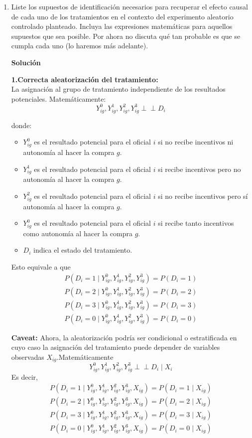 \documentclass[a4paper, answers, addpoints, 11pt]{exam}
\newenvironment{solucion}{%
  \begin{mdframed}[
    backgroundcolor=blue!5,    %
    linecolor=blue!50,          %
    linewidth=2pt,              %
    leftmargin=10pt,            %
    rightmargin=10pt,           %
    topline=true,              %
    bottomline=true,            %
    roundcorner=10pt,           %
    innerleftmargin=10pt,       %
    innerrightmargin=10pt,      %
    innerbottommargin=10pt,     %
    innertopmargin=10pt         %
  ]%
  \begin{tcolorbox}[colframe=blue!50!black, colback=blue!50, coltitle=white, sharp corners=all, boxrule=1mm, width=\textwidth, halign=left, valign=center, top=0mm, bottom=0mm, left=0mm, right=0mm] \textbf{Solución} \end{tcolorbox} }{\end{mdframed}}
\begin{document}
\begin{enumerate}
    \item Liste los supuestos de identificación necesarios para recuperar el efecto causal de cada uno de los tratamientos en el contexto del experimento aleatorio controlado planteado. Incluya las expresiones matemáticas para aquellos supuestos que sea posible. Por ahora no discuta qué tan probable es que se cumpla cada uno (lo haremos más adelante). 
    \begin{solucion}
    \textbf{1.Correcta aleatorización del tratamiento:}\\
    La asignación al grupo de tratamiento independiente de los resultados potenciales. Matemáticamente:
   \[
Y_{ig}^0, Y_{ig}^1, Y_{ig}^2, Y_{ig}^3 \perp\!\!\!\perp D_i
\]

donde:
\begin{itemize}
    \item \( Y_{ig}^0 \) es el resultado potencial para el oficial \( i \) si no recibe incentivos ni autonomía al hacer la compra \( g \).
  \item \( Y_{ig}^1 \) es el resultado potencial para el oficial \( i \) si recibe incentivos pero no autonomía al hacer la compra \( g \).
  \item \( Y_{ig}^2 \) es el resultado potencial para el oficial \( i \) si no recibe incentivos pero sí autonomía al hacer la compra \( g \).
  \item \( Y_{ig}^0 \) es el resultado potencial para el oficial \( i \) si recibe tanto incentivos como autonomía al hacer la compra \( g \).
    \item \( D_i \) indica el estado del tratamiento.
\end{itemize}
Esto equivale a que \begin{gather*}
 P(D_i = 1 \mid Y_{ig}^0, Y_{ig}^1, Y_{ig}^2, Y_{ig}^3) = P(D_i = 1)\\
P(D_i = 2 \mid Y_{ig}^0, Y_{ig}^1, Y_{ig}^2, Y_{ig}^3) = P(D_i = 2)\\
P(D_i = 3 \mid Y_{ig}^0, Y_{ig}^1, Y_{ig}^2, Y_{ig}^3) = P(D_i = 3)\\
P(D_i = 0 \mid Y_{ig}^0, Y_{ig}^1, Y_{ig}^2, Y_{ig}^3) = P(D_i = 0)   
\end{gather*}

\begin{mdframed}[backgroundcolor=moraditoClaro]
\textbf{Caveat:} Ahora, la aleatorización podría ser condicional o estratificada en cuyo caso la asignación del tratamiento puede depender de variables observadas \(X_{ig}\).Matemáticamente \[
Y_{ig}^0, Y_{ig}^1, Y_{ig}^2, Y_{ig}^3 \perp\!\!\!\perp D_i \mid X_i
\]
Es decir,
\begin{gather*}
 P(D_i = 1 \mid Y_{ig}^0, Y_{ig}^1, Y_{ig}^2, Y_{ig}^3,X_{ig}) = P(D_i = 1\mid X_{ig})\\
P(D_i = 2 \mid Y_{ig}^0, Y_{ig}^1, Y_{ig}^2, Y_{ig}^3,X_{ig}) = P(D_i = 2\mid X_{ig})\\
P(D_i = 3 \mid Y_{ig}^0, Y_{ig}^1, Y_{ig}^2, Y_{ig}^3,X_{ig}) = P(D_i = 3\mid X_{ig})\\
P(D_i = 0 \mid Y_{ig}^0, Y_{ig}^1, Y_{ig}^2, Y_{ig}^3,X_{ig}) = P(D_i = 0\mid X_{ig})   
\end{gather*}


\end{mdframed}
\end{solucion}
\end{enumerate}
\end{document}
